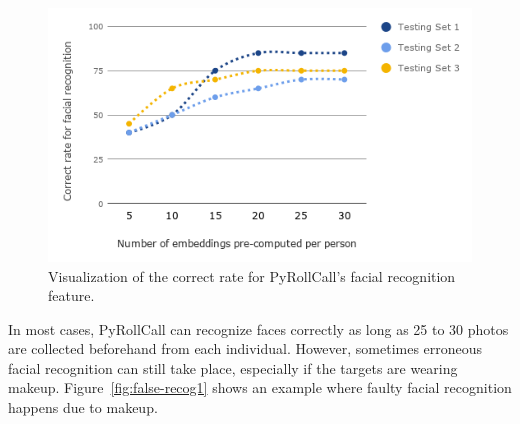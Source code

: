 \begin{figure}[!htb]
  \centering
  \includegraphics[width=0.85\linewidth]{figures/exp-result-chart.png}
  \caption{Visualization of the correct rate for PyRollCall's facial recognition feature.}
  \label{fig:exp-result-chart}
\end{figure}
\clearpage


In most cases, PyRollCall can recognize faces correctly as long as 25 to 30 photos are collected
beforehand from each individual. However, sometimes erroneous facial recognition can still take place,
especially if the targets are wearing makeup. Figure~\ref{fig:false-recog1} shows an example where
faulty facial recognition happens due to makeup.
\vspace{0.2cm}


